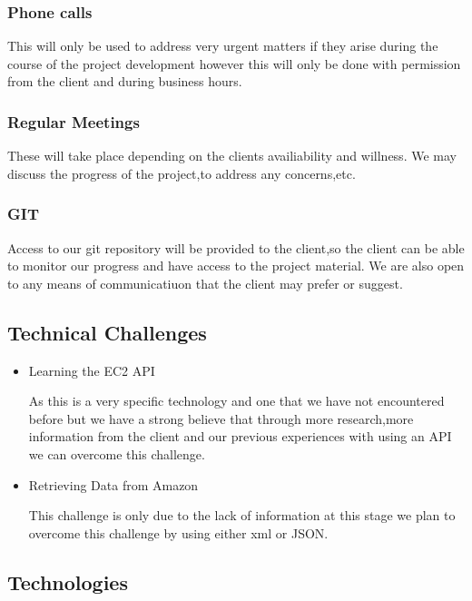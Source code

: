 \documentclass[a4paper,12pt]{article}
\begin{document}
\subsubsection{Phone calls}
This will only be used to address very urgent matters if they arise during the course of the project development
however this will only be done with permission from the client and during business hours.
\subsubsection{Regular Meetings}
These will take place depending on the clients availiability and willness.
We may discuss the progress of the project,to address any concerns,etc.
\subsubsection{GIT}
Access to our git repository will be provided to the client,so the client can be able to monitor
our progress and have access to the project material.
We are also open to any means of communicatiuon that the client may prefer or suggest.
\subsection{Technical Challenges}
\begin{itemize}
\item Learning the EC2 API 

As this is a very specific technology and one that we have not encountered before but we have a strong believe that 
through more research,more information from the client and our previous experiences with using an API we can overcome this challenge.

\item Retrieving Data from Amazon

This challenge is only due to the lack of information at this stage we plan to overcome this challenge by using either xml or JSON.
\end{itemize}
\subsection{Technologies}
\end{document}
